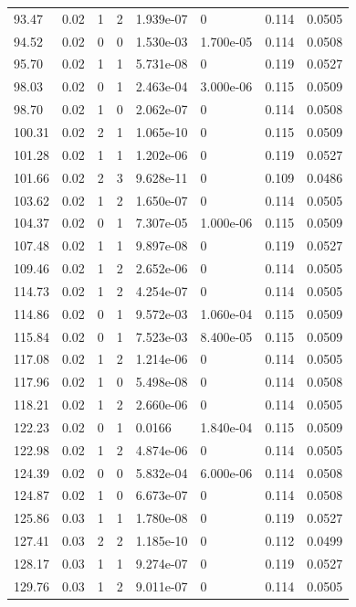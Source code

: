 \documentclass[preview]{standalone}
\begin{document}
{{{\begin{tabular}{L{1.2cm}C{1.2cm} C{0.3cm}C{0.5cm} C{1.4cm}C{1.4cm} C{1.4cm}C{1.4cm}}
  93.47  &  0.02  & 1     &  2 &  1.939e-07  & 0  & 0.114 &  0.0505   \\ 
  94.52  &  0.02  & 0     &  0 &  1.530e-03  & 1.700e-05  & 0.114 &  0.0508   \\ 
  95.70  &  0.02  & 1     &  1 &  5.731e-08  & 0  & 0.119 &  0.0527   \\ 
  98.03  &  0.02  & 0     &  1 &  2.463e-04  & 3.000e-06  & 0.115 &  0.0509   \\ 
  98.70  &  0.02  & 1     &  0 &  2.062e-07  & 0  & 0.114 &  0.0508   \\ 
  100.31  &  0.02  & 2     &  1 &  1.065e-10  & 0  & 0.115 &  0.0509   \\ 
  101.28  &  0.02  & 1     &  1 &  1.202e-06  & 0  & 0.119 &  0.0527   \\ 
  101.66  &  0.02  & 2     &  3 &  9.628e-11  & 0  & 0.109 &  0.0486   \\ 
  103.62  &  0.02  & 1     &  2 &  1.650e-07  & 0  & 0.114 &  0.0505   \\ 
  104.37  &  0.02  & 0     &  1 &  7.307e-05  & 1.000e-06  & 0.115 &  0.0509   \\ 
  107.48  &  0.02  & 1     &  1 &  9.897e-08  & 0  & 0.119 &  0.0527   \\ 
  109.46  &  0.02  & 1     &  2 &  2.652e-06  & 0  & 0.114 &  0.0505   \\ 
  114.73  &  0.02  & 1     &  2 &  4.254e-07  & 0  & 0.114 &  0.0505   \\ 
  114.86  &  0.02  & 0     &  1 &  9.572e-03  & 1.060e-04  & 0.115 &  0.0509   \\ 
  115.84  &  0.02  & 0     &  1 &  7.523e-03  & 8.400e-05  & 0.115 &  0.0509   \\ 
  117.08  &  0.02  & 1     &  2 &  1.214e-06  & 0  & 0.114 &  0.0505   \\ 
  117.96  &  0.02  & 1     &  0 &  5.498e-08  & 0  & 0.114 &  0.0508   \\ 
  118.21  &  0.02  & 1     &  2 &  2.660e-06  & 0  & 0.114 &  0.0505   \\ 
  122.23  &  0.02  & 0     &  1 &  0.0166  & 1.840e-04  & 0.115 &  0.0509   \\ 
  122.98  &  0.02  & 1     &  2 &  4.874e-06  & 0  & 0.114 &  0.0505   \\ 
  124.39  &  0.02  & 0     &  0 &  5.832e-04  & 6.000e-06  & 0.114 &  0.0508   \\ 
  124.87  &  0.02  & 1     &  0 &  6.673e-07  & 0  & 0.114 &  0.0508   \\ 
  125.86  &  0.03  & 1     &  1 &  1.780e-08  & 0  & 0.119 &  0.0527   \\ 
  127.41  &  0.03  & 2     &  2 &  1.185e-10  & 0  & 0.112 &  0.0499   \\ 
  128.17  &  0.03  & 1     &  1 &  9.274e-07  & 0  & 0.119 &  0.0527   \\ 
  129.76  &  0.03  & 1     &  2 &  9.011e-07  & 0  & 0.114 &  0.0505   \\ 
\hline 
\end{tabular} 

}}}
\end{document}
